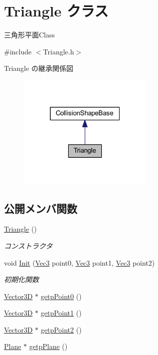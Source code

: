 \hypertarget{class_triangle}{}\section{Triangle クラス}
\label{class_triangle}


三角形平面\+Class  




{\ttfamily \#include $<$Triangle.\+h$>$}



Triangle の継承関係図\nopagebreak
\begin{figure}[H]
\begin{center}
\leavevmode
\includegraphics[width=184pt]{class_triangle__inherit__graph}
\end{center}
\end{figure}
\subsection*{公開メンバ関数}
\begin{DoxyCompactItemize}
\item 
\mbox{\hyperlink{class_triangle_aaefe4ed500c07918d30c6f0e286332c5}{Triangle}} ()
\begin{DoxyCompactList}\small\item\em コンストラクタ \end{DoxyCompactList}\item 
void \mbox{\hyperlink{class_triangle_a291c8c4aeeb85e4561e4fd162816f5da}{Init}} (\mbox{\hyperlink{_vector3_d_8h_ab16f59e4393f29a01ec8b9bbbabbe65d}{Vec3}} point0, \mbox{\hyperlink{_vector3_d_8h_ab16f59e4393f29a01ec8b9bbbabbe65d}{Vec3}} point1, \mbox{\hyperlink{_vector3_d_8h_ab16f59e4393f29a01ec8b9bbbabbe65d}{Vec3}} point2)
\begin{DoxyCompactList}\small\item\em 初期化関数 \end{DoxyCompactList}\item 
\mbox{\hyperlink{class_vector3_d}{Vector3D}} $\ast$ \mbox{\hyperlink{class_triangle_a0f6221dde9919de0067299847f4966b8}{getp\+Point0}} ()
\item 
\mbox{\hyperlink{class_vector3_d}{Vector3D}} $\ast$ \mbox{\hyperlink{class_triangle_a9420de30b090fcaae621dab303bda541}{getp\+Point1}} ()
\item 
\mbox{\hyperlink{class_vector3_d}{Vector3D}} $\ast$ \mbox{\hyperlink{class_triangle_ab2c7e8aea2b27b51b068b34f1d7a1ce0}{getp\+Point2}} ()
\item 
\mbox{\hyperlink{class_plane}{Plane}} $\ast$ \mbox{\hyperlink{class_triangle_a559a6888cea5697dfd3943fa4a153d07}{getp\+Plane}} ()
\end{DoxyCompactItemize}
